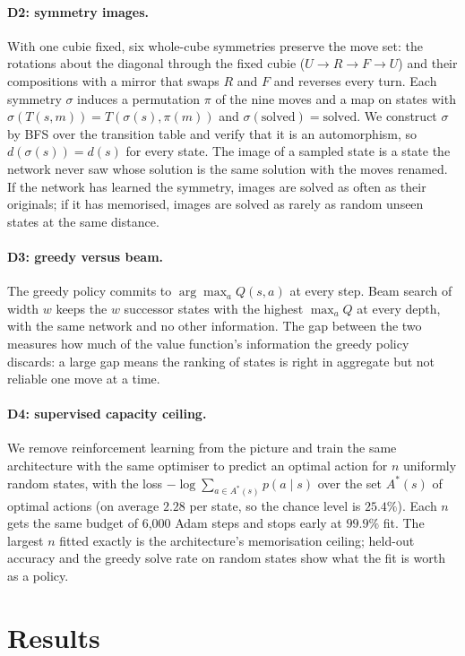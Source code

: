 \documentclass[11pt]{article}
\newcommand{\Q}{Q}
\newcommand{\dist}{d}
\begin{document}
\paragraph{D2: symmetry images.}
With one cubie fixed, six whole-cube symmetries preserve the move set: the rotations about the
diagonal through the fixed cubie ($U\!\to\!R\!\to\!F\!\to\!U$) and their compositions with a
mirror that swaps $R$ and $F$ and reverses every turn. Each symmetry $\sigma$ induces a
permutation $\pi$ of the nine moves and a map on states with
$\sigma(T(s,m)) = T(\sigma(s),\pi(m))$ and $\sigma(\text{solved})=\text{solved}$. We construct
$\sigma$ by BFS over the transition table and verify that it is an automorphism, so
$\dist(\sigma(s)) = \dist(s)$ for every state. The image of a sampled state is a state the
network never saw whose solution is the same solution with the moves renamed. If the network
has learned the symmetry, images are solved as often as their originals; if it has memorised,
images are solved as rarely as random unseen states at the same distance.

\paragraph{D3: greedy versus beam.}
The greedy policy commits to $\arg\max_a \Q(s,a)$ at every step. Beam search of width $w$ keeps
the $w$ successor states with the highest $\max_a \Q$ at every depth, with the same network and
no other information. The gap between the two measures how much of the value function's
information the greedy policy discards: a large gap means the ranking of states is right in
aggregate but not reliable one move at a time.

\paragraph{D4: supervised capacity ceiling.}
We remove reinforcement learning from the picture and train the same architecture with the
same optimiser to predict an optimal action for $n$ uniformly random states, with the loss
$-\log\sum_{a\in A^*(s)} p(a\mid s)$ over the set $A^*(s)$ of optimal actions (on average
$2.28$ per state, so the chance level is $25.4\%$). Each $n$ gets the same budget of 6{,}000 Adam
steps and stops early at $99.9\%$ fit. The largest $n$ fitted exactly is the architecture's
memorisation ceiling; held-out accuracy and the greedy solve rate on random states show what the
fit is worth as a policy.

\section{Results}
\label{sec:results}
\end{document}
